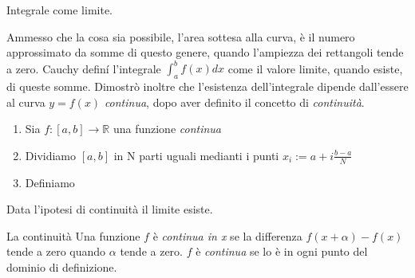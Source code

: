 \begin{frame}
  \begin{block}{Integrale come limite.}

    \alert{Ammesso che la cosa sia possibile}, l'area sottesa alla curva,
    è il numero approssimato da somme di questo genere, quando l'ampiezza dei rettangoli
    tende a zero. 
    Cauchy definí l'integrale $\int_{a}^bf(x)dx$ come il valore limite, quando esiste,
    di queste somme.
    Dimostrò inoltre che l'esistenza dell'integrale dipende dall'essere al curva $y=f(x)$ \textit{continua},
    dopo aver definito il concetto di \textit{continuità}.


  \begin{enumerate}
    \item Sia $f: [a,b] \rightarrow \mathbb{R}$ una funzione \textit{continua}
    \item Dividiamo $[a,b]$ in N parti uguali medianti i punti $x_i := a + i\frac{b-a}{N}$ 
    \item Definiamo 
  \end{enumerate}

  Data l'ipotesi di continuità il limite esiste.
  \end{block}

  \begin{block}{La continuità}
    Una funzione $f$ è \textit{continua in x} se la differenza $f(x+\alpha) - f(x)$ 
    tende a zero quando $\alpha$ tende a zero. $f$ è \textit{continua} se lo è in ogni
    punto del dominio di definizione.
  \end{block}


\end{frame}



